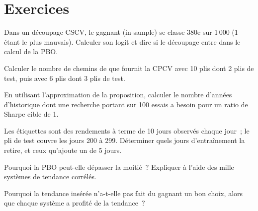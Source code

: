 \section{Exercices}

\begin{exercise}[$\star$]\label{exo:rs:overfitting:1}
Dans un découpage CSCV, le gagnant  (in-sample) se classe 380e sur 1\,000  (1 étant le plus mauvais). Calculer son logit et dire si le découpage entre dans le calcul de la PBO.
\end{exercise}

\begin{exercise}[$\star$]\label{exo:rs:overfitting:2}
Calculer le nombre de chemins de  que fournit la CPCV avec 10 plis dont 2 plis de test, puis avec 6 plis dont 3 plis de test.
\end{exercise}

\begin{exercise}[$\star$]\label{exo:rs:overfitting:3}
En utilisant l'approximation de la proposition, calculer le nombre d'années d'historique dont une recherche portant sur 100 essais a besoin pour un ratio de Sharpe cible de 1.
\end{exercise}

\begin{exercise}[$\star\star$]\label{exo:rs:overfitting:4}
Les étiquettes sont des rendements à terme de 10 jours observés chaque jour~; le pli de test couvre les jours 200 à 299. Déterminer quels jours d'entraînement la  retire, et ceux qu'ajoute un  de
5 jours.
\end{exercise}

\begin{exercise}[$\star\star$]\label{exo:rs:overfitting:5}
Pourquoi la PBO peut-elle dépasser la moitié~? Expliquer à l'aide des mille systèmes de tendance corrélés.
\end{exercise}

\begin{exercise}[$\star\star$]\label{exo:rs:overfitting:6}
Pourquoi la tendance insérée n'a-t-elle pas fait du gagnant  un bon choix, alors que chaque système a profité de la tendance~?
\end{exercise}

